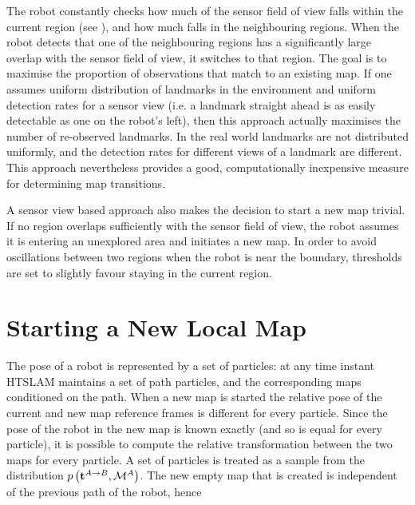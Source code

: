 The robot constantly checks how much of the sensor field of view falls
within the current region (see ), and how much
falls in the neighbouring regions. When the robot detects that one of
the neighbouring regions has a significantly large overlap with the
sensor field of view, it switches to that region. The goal is to
maximise the proportion of observations that match to an existing map.
If one assumes uniform distribution of landmarks in the environment
and uniform detection rates for a sensor view (i.e. a landmark
straight ahead is as easily detectable as one on the robot's left),
then this approach actually maximises the number of re-observed
landmarks. In the real world landmarks are not distributed uniformly,
and the detection rates for different views of a landmark are
different. This approach nevertheless provides a good, computationally
inexpensive measure for determining map transitions.

A sensor view based approach also makes the decision to start a new
map trivial. If no region overlaps sufficiently with the sensor field
of view, the robot assumes it is entering an unexplored area and
initiates a new map. In order to avoid oscillations between two
regions when the robot is near the boundary, thresholds are set to
slightly favour staying in the current region.


\section{Starting a New Local Map}
\label{sec:starting_new_map}


The pose of a robot is represented by a set of particles: at any time
instant HTSLAM maintains a set of path particles, and the
corresponding maps conditioned on the path. When a new map is started
the relative pose of the current and new map reference frames is
different for every particle. Since the pose of the robot in the new
map is known exactly (and so is equal for every particle), it is
possible to compute the relative transformation between the two maps
for every particle. A set of particles is treated as a sample from
the distribution $\prob{\tr{}{A}{B},\mapA}$.  The new empty map that
is created is independent of the previous path of the robot, hence

